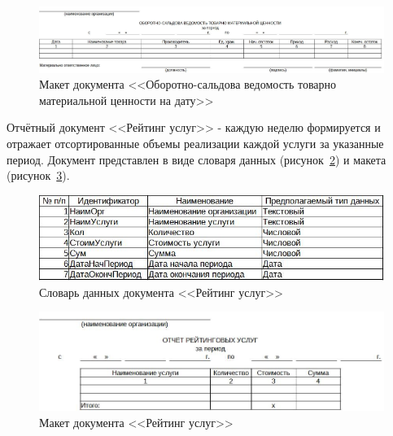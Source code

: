 \documentclass[12pt, a4paper, simple]{eskdtext}
\begin{document}
    \begin{figure}[!h]
        \centering
        \includegraphics[width=16cm]
            {_docs/ОТ_ОборСальдВед_макет.jpg}
        \caption{Макет документа <<Оборотно-сальдова ведомость товарно материальной ценности на дату>>}
        \label{fig:OT_OborSaldVed_maket}
    \end{figure}

    \newpage

    Отчётный документ <<Рейтинг услуг>>
    - каждую неделю формируется и отражает отсортированные объемы реализации каждой услуги за указанные период.
    Документ представлен в виде словаря данных (рисунок~\ref{fig:OT_ReitYslyg_tipi})
    и макета (рисунок~\ref{fig:OT_ReitYslyg_maket}).

    \begin{figure}[!h]
        \centering
        \includegraphics[]
            {_docs/ОТ_РейтУслуг_типы.jpg}
        \caption{Словарь данных документа <<Рейтинг услуг>>}
        \label{fig:OT_ReitYslyg_tipi}
    \end{figure}

    \begin{figure}[!h]
        \centering
        \includegraphics[width=16cm]
            {_docs/ОТ_РейтУслуг_макет.jpg}
        \caption{Макет документа <<Рейтинг услуг>>}
        \label{fig:OT_ReitYslyg_maket}
    \end{figure}

    \newpage
\end{document}
